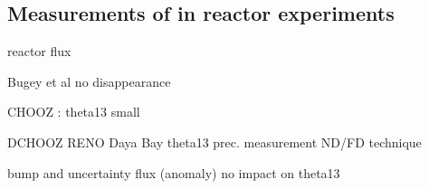 \subsection{Measurements of \thint in reactor experiments}

reactor flux

Bugey et al no disappearance

CHOOZ : theta13 small

DCHOOZ RENO Daya Bay theta13 prec. measurement ND/FD technique

bump and uncertainty flux (anomaly) no impact on theta13

